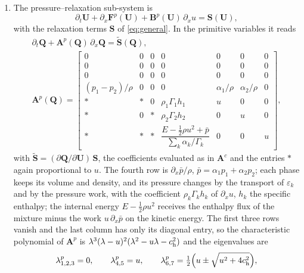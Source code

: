 \begin{enumerate}
The characteristic speeds are the flow velocity and zero. The volume fraction is transported only by this sub-system; in
the pressure--relaxation sub-system it changes only through the relaxation terms.
\item The pressure--relaxation sub-system is
\begin{equation}
\partial_t\mathbf U+\partial_x\mathbf F^p(\mathbf U)+\mathbf B^p(\mathbf U)\,\partial_xu=\mathbf S(\mathbf U),
\label{eq:pressure_sub}
\end{equation}
with the relaxation terms $\mathbf S$ of \eqref{eq:general}. In the primitive variables it reads
\begin{equation}
\begin{gathered}
\partial_t\mathbf Q+\mathbf A^p(\mathbf Q)\,\partial_x\mathbf Q=\tilde{\mathbf S}(\mathbf Q),\\
\mathbf A^p(\mathbf Q)=\begin{bmatrix}
0&0&0&0&0&0&0\\
0&0&0&0&0&0&0\\
0&0&0&0&0&0&0\\
(p_1-p_2)/\rho&0&0&0&\alpha_1/\rho&\alpha_2/\rho&0\\
\ast&\ast&0&\rho_1\Gamma_1h_1&u&0&0\\
\ast&0&\ast&\rho_2\Gamma_2h_2&0&u&0\\
\ast&\ast&\ast&\dfrac{E-\tfrac12\rho u^2+\bar p}{\sum_k\alpha_k/\Gamma_k}&0&0&u
\end{bmatrix},
\end{gathered}
\label{eq:Ap}
\end{equation}
with $\tilde{\mathbf S}=(\partial\mathbf Q/\partial\mathbf U)\,\mathbf S$, the coefficients evaluated as in $\mathbf A^c$ and the entries $\ast$ again proportional to $u$. The fourth row is $\partial_x\bar p/\rho$,
$\bar p=\alpha_1p_1+\alpha_2p_2$; each phase keeps its volume and density, and its pressure changes by the transport of $\varepsilon_k$ and by
the pressure work, with the coefficient $\rho_k\Gamma_kh_k$ of $\partial_xu$, $h_k$ the specific enthalpy; the internal energy $E-\tfrac12\rho u^2$ receives
the enthalpy flux of the mixture minus the work $u\,\partial_x\bar p$ on the kinetic energy. The first three rows vanish and the last
column has only its diagonal entry, so the characteristic polynomial of $\mathbf A^p$ is $\lambda^3(\lambda-u)^2(\lambda^2-u\lambda-c_{\rm h}^2)$ and the
eigenvalues are
\begin{equation}
\begin{gathered}
\lambda^p_{1,2,3}=0,\qquad\lambda^p_{4,5}=u,\qquad \lambda^p_{6,7}=\tfrac12\Big(u\pm\sqrt{u^2+4c_{\rm h}^2}\Big),\\

\end{gathered}
\end{equation}
\end{enumerate}
